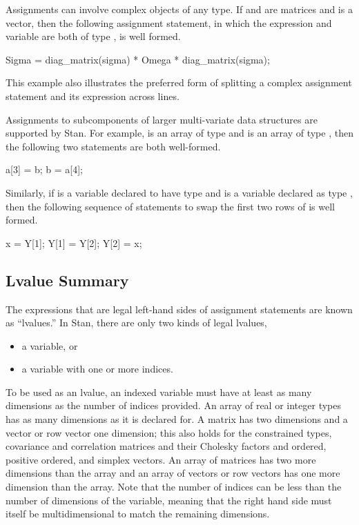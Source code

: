 Assignments can involve complex objects of any type.  If 
and  are matrices and  is a vector, then the
following assignment statement, in which the expression and variable
are both of type , is well formed.
%
\begin{stancode}
Sigma
  = diag_matrix(sigma)
     * Omega
     * diag_matrix(sigma);
\end{stancode}
%
This example also illustrates the preferred form of splitting a
complex assignment statement and its expression across lines.

Assignments to subcomponents of larger multi-variate data structures
are supported by Stan.  For example,  is an array of type
 and  is an array of type , then
the following two statements are both well-formed.
%
\begin{stancode}
a[3] = b;
b = a[4];
\end{stancode}
%
Similarly, if  is a variable declared to have type
 and  is a variable declared as type
, then the following sequence of statements to swap the
first two rows of  is well formed.
%
\begin{stancode}
x = Y[1];
Y[1] = Y[2];
Y[2] = x;
\end{stancode}
%

\subsection{Lvalue Summary}

The expressions that are legal left-hand sides of assignment
statements are known as ``lvalues.''  In Stan, there are only two
kinds of legal lvalues,
%
\begin{itemize}
\item a variable, or
\item a variable with one or more indices.
\end{itemize}
%
To be used as an lvalue, an indexed variable must have at least as
many dimensions as the number of indices provided.  An array of real
or integer types has as many dimensions as it is declared for.  A
matrix has two dimensions and a vector or row vector one dimension;
this also holds for the constrained types, covariance and correlation
matrices and their Cholesky factors and ordered, positive ordered, and
simplex vectors.  An array of matrices has two more dimensions than
the array and an array of vectors or row vectors has one more
dimension than the array.  Note that the number of indices can be less
than the number of dimensions of the variable, meaning that the right
hand side must itself be multidimensional to match the remaining
dimensions.

